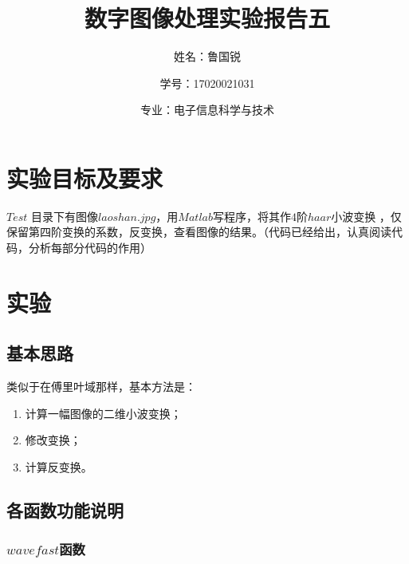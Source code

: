 \documentclass[UTF8]{ctexart}
\title{数字图像处理实验报告五}
\author{姓名：鲁国锐 \protect\newline
\and 学号：17020021031 \\
\and 专业：电子信息科学与技术}
\begin{document}
	\maketitle
	\renewcommand{\contentsname}{目录}
	\renewcommand{\listfigurename}{插图目录}
	\renewcommand{\listtablename}{表格目录}
	\renewcommand{\refname}{参考文献}
	\renewcommand{\abstractname}{摘要}
	\renewcommand{\indexname}{索引}
	\renewcommand{\tablename}{表}
	\renewcommand{\figurename}{图}
	
	
	
	\tableofcontents
	\newpage
	
	\hypersetup{
	bookmarks=true,
	colorlinks=true,
	linkcolor=red,
	urlcolor=blue
	}
    
    \section{实验目标及要求}
        \indent $Test$ 目录下有图像$laoshan.jpg$，用$Matlab$写程序，将其作$4$阶$haar$小波变换 ，仅保留第四阶变换的系数，反变换，查看图像的结果。（代码已经给出，认真阅读代码，分析每部分代码的作用）   


    \section{实验}
        
        \subsection{基本思路}

                
                \indent 类似于在傅里叶域那样，基本方法是\cite{digit_image_Gonzalez}：

                    \begin{enumerate}[leftmargin=50pt]
        				\item 计算一幅图像的二维小波变换；
                        \item 修改变换；
                        \item 计算反变换。
        			\end{enumerate}                 
        
        \subsection{各函数功能说明}
        
            \subsubsection{$wavefast$函数}
                
\end{document}
